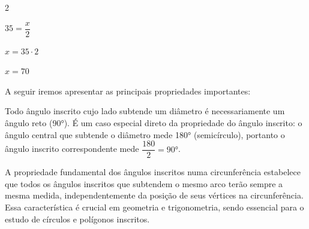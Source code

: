 \documentclass[12pt]{article}
\begin{document}
\begin{multicols}{2}
\begin{center}
\end{center}

\vspace{8px}
$35 = \dfrac{x}{2}$ \vspace{8px}

$x = 35 \cdot 2$

$x = 70$


A seguir iremos apresentar as principais propriedades importantes:


Todo ângulo inscrito cujo lado subtende um diâmetro é necessariamente um ângulo reto (\ang{90}). É um caso especial direto da propriedade do ângulo inscrito: o ângulo central que subtende o diâmetro mede \ang{180} (semicírculo), portanto o ângulo inscrito correspondente mede $\dfrac{180}{2} = \ang{90}$.

\begin{center}
\end{center}


A propriedade fundamental dos ângulos inscritos numa circunferência estabelece que todos os ângulos inscritos que subtendem o mesmo arco terão sempre a mesma medida, independentemente da posição de seus vértices na circunferência. Essa característica é crucial em geometria e trigonometria, sendo essencial para o estudo de círculos e polígonos inscritos.


\end{multicols}
\end{document}
